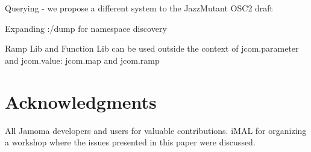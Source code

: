 \documentclass{NIME-alternate}
\begin{document}
Querying - we propose a different system to the JazzMutant OSC2 draft

Expanding :/dump for namespace discovery

Ramp Lib and Function Lib can be used outside the context of jcom.parameter and jcom.value: jcom.map and jcom.ramp











\section{Acknowledgments} %
\label{sec:acknowledgments}

All Jamoma developers and users for valuable contributions. 
iMAL for organizing a workshop where the issues presented in this paper were discussed.





%
\begin{small}

\end{small}
%


\balancecolumns %
\end{document}
